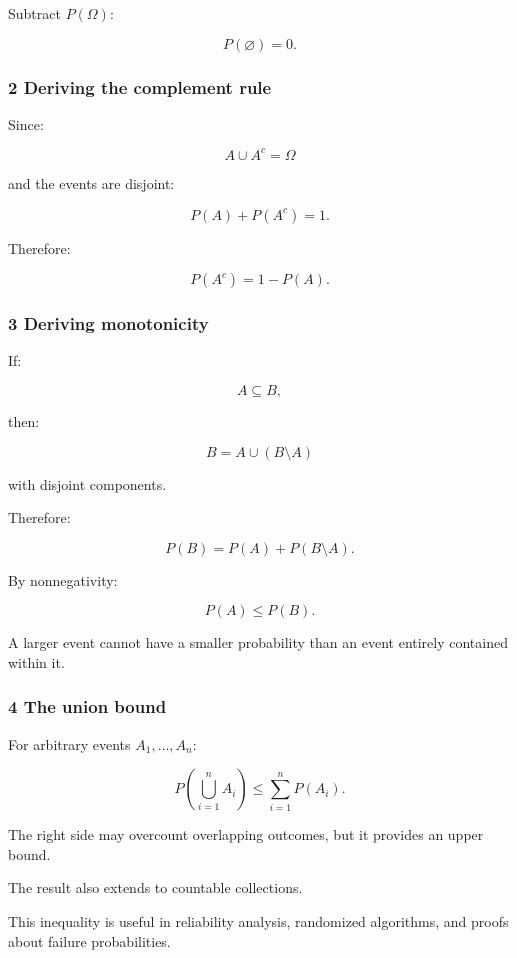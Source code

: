 Subtract \(P(\Omega)\):

\[
 \boxed{P(\varnothing)=0}.
\]

\subsubsection{2 Deriving the complement rule}\label{02-foundations-ii-ch023-deriving-the-complement-rule}

Since:

\[
 A\cup A^c=\Omega
\]

and the events are disjoint:

\[
 P(A)+P(A^c)=1.
\]

Therefore:

\[
 \boxed{P(A^c)=1-P(A)}.
\]

\subsubsection{3 Deriving monotonicity}\label{02-foundations-ii-ch023-deriving-monotonicity}

If:

\[
 A\subseteq B,
\]

then:

\[
 B=A\cup(B\setminus A)
\]

with disjoint components.

Therefore:

\[
 P(B)=P(A)+P(B\setminus A).
\]

By nonnegativity:

\[
 \boxed{P(A)\le P(B)}.
\]

A larger event cannot have a smaller probability than an event entirely contained within it.

\subsubsection{4 The union bound}\label{02-foundations-ii-ch023-the-union-bound}

For arbitrary events \(A_1,\ldots,A_n\):

\[
 \boxed{ P\left(\bigcup_{i=1}^{n}A_i\right) \le \sum_{i=1}^{n}P(A_i) }.
\]

The right side may overcount overlapping outcomes, but it provides an upper bound.

The result also extends to countable collections.

This inequality is useful in reliability analysis, randomized algorithms, and proofs about failure probabilities.

